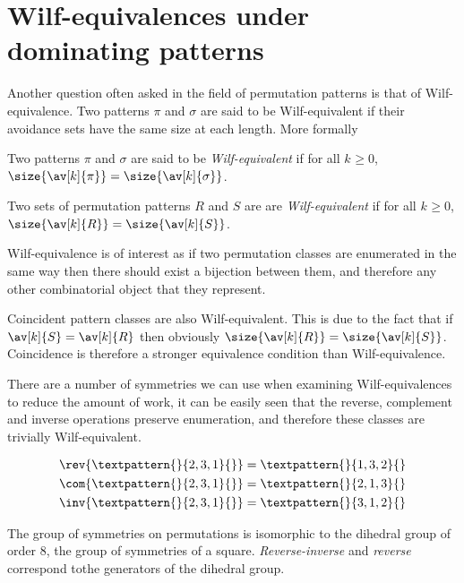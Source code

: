 \chapter[Wilf-Classification]{Wilf-equivalences under dominating  patterns}

Another question often asked in the field of permutation patterns is that
of Wilf-equivalence. Two patterns \(\pi\) and \(\sigma\) are said to be
Wilf-equivalent if their avoidance sets have the same size at each
length. More formally

\begin{definition}
    Two patterns \(\pi\) and \(\sigma\) are said to be \emph{Wilf-equivalent}
    if for all \(k_{} \ge 0\), \(\size{\av[k]{\pi}} = \size{\av[k]{\sigma}}\).

    Two sets of permutation patterns \(R\) and \(S\) are are
    \emph{Wilf-equivalent} if for all \(k_{} \ge 0\),
    \(\size{\av[k]{R}} = \size{\av[k]{S}}\).
\end{definition}

Wilf-equivalence is of interest as if two permutation classes are enumerated
in the same way then there should exist a bijection between them, and therefore
any other combinatorial object that they represent.

Coincident pattern classes are also Wilf-equivalent. This is due to the fact that
if \(\av[k]{S} = \av[k]{R}\) then obviously \(\size{\av[k]{R}} = \size{\av[k]{S}}\).
Coincidence is therefore a stronger equivalence condition than Wilf-equivalence.

There are a number of symmetries we can use when examining Wilf-equivalences
to reduce the amount of work, it can be easily seen that the reverse, complement
and inverse operations preserve enumeration, and therefore these classes are trivially
Wilf-equivalent.

\begin{align*}
    \rev{\textpattern{}{2,3,1}{}} &= \textpattern{}{1,3,2}{}\\
    \com{\textpattern{}{2,3,1}{}} &= \textpattern{}{2,1,3}{}\\
    \inv{\textpattern{}{2,3,1}{}} &= \textpattern{}{3,1,2}{}
\end{align*}

The group of symmetries on permutations is isomorphic to the dihedral group
of order \(8\), the group of symmetries of a square. \emph{Reverse-inverse} and
\emph{reverse} correspond tothe generators of the dihedral group.


